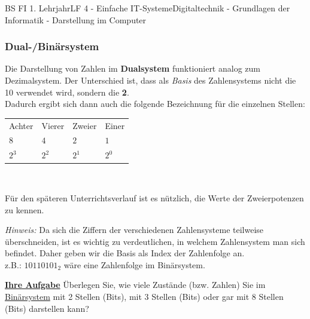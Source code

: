 \documentclass[11pt,twocolumn,oneside,openany,headings=optiontotoc,11pt,numbers=noenddot]{article}
\begin{document}
\begin{worksheet}{BS FI 1. Lehrjahr}{LF 4 - Einfache IT-Systeme}{Digitaltechnik - Grundlagen der Informatik - Darstellung im Computer}
		\subsubsection{Dual-/Binärsystem}
		Die Darstellung von Zahlen im \textbf{Dualsystem} funktioniert analog zum Dezimalsystem. Der Unterschied ist, dass als \textit{Basis} des Zahlensystems nicht die 10 verwendet wird, sondern die \textbf{2}.\\
		Dadurch ergibt sich dann auch die folgende Bezeichnung für die einzelnen Stellen:\\
		\par\noindent
		\begin{tabularx}{0.48\textwidth}{MMMM}
			\grqq{}Achter\grqq{} & \grqq{}Vierer\grqq{} & \grqq{}Zweier\grqq{} & \grqq{}Einer\grqq{}\\
			\(8\) & \(4\) & \(2\) & \(1\)\\
			\(2^3\) & \(2^2\) & \(2^1\) & \(2^0\)
		\end{tabularx}\\
		\par\noindent
		Für den späteren Unterrichtsverlauf ist es nützlich, die Werte der Zweierpotenzen zu kennen.
		\par\noindent
		\textit{Hinweis:} Da sich die Ziffern der verschiedenen Zahlensysteme teilweise überschneiden, ist es wichtig zu verdeutlichen, in welchem Zahlensystem man sich befindet. Daher geben wir die Basis als Index der Zahlenfolge an.\\
		z.B.: \(10110101_2\) wäre eine Zahlenfolge im Binärsystem.\\
		\par\noindent
		\textbf{\underline{Ihre Aufgabe}} Überlegen Sie, wie viele Zustände (bzw. Zahlen) Sie im \underline{Binärsystem} mit 2 Stellen (Bits), mit 3 Stellen (Bits) oder gar mit 8 Stellen (Bits) darstellen kann?

\end{worksheet}
\end{document}
